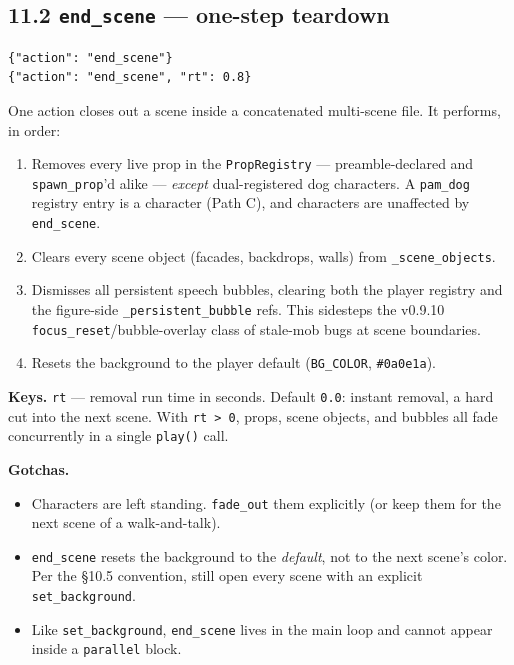 \documentclass[
  11pt,
]{book}
\begin{document}
\subsection{\texorpdfstring{11.2 \texttt{end\_scene} --- one-step
teardown}{11.2 end\_scene --- one-step teardown}}\label{end-scene-one-step-teardown}

\begin{verbatim}
{"action": "end_scene"}
{"action": "end_scene", "rt": 0.8}
\end{verbatim}

One action closes out a scene inside a concatenated multi-scene file.
It performs, in order:

\begin{enumerate}
\item
  Removes every live prop in the \texttt{PropRegistry} ---
  preamble-declared and \texttt{spawn\_prop}'d alike --- \emph{except}
  dual-registered dog characters. A \texttt{pam\_dog} registry entry is
  a character (Path C), and characters are unaffected by
  \texttt{end\_scene}.
\item
  Clears every scene object (facades, backdrops, walls) from
  \texttt{\_scene\_objects}.
\item
  Dismisses all persistent speech bubbles, clearing both the player
  registry and the figure-side \texttt{\_persistent\_bubble} refs. This
  sidesteps the v0.9.10 \texttt{focus\_reset}/bubble-overlay class of
  stale-mob bugs at scene boundaries.
\item
  Resets the background to the player default (\texttt{BG\_COLOR},
  \texttt{\#0a0e1a}).
\end{enumerate}

\textbf{Keys.} \texttt{rt} --- removal run time in seconds. Default
\texttt{0.0}: instant removal, a hard cut into the next scene. With
\texttt{rt\ \textgreater{}\ 0}, props, scene objects, and bubbles all
fade concurrently in a single \texttt{play()} call.

\textbf{Gotchas.}

\begin{itemize}
\item
  Characters are left standing. \texttt{fade\_out} them explicitly (or
  keep them for the next scene of a walk-and-talk).
\item
  \texttt{end\_scene} resets the background to the \emph{default},
  not to the next scene's color. Per the §10.5 convention, still open
  every scene with an explicit \texttt{set\_background}.
\item
  Like \texttt{set\_background}, \texttt{end\_scene} lives in the main
  loop and cannot appear inside a \texttt{parallel} block.
\end{itemize}
\end{document}
